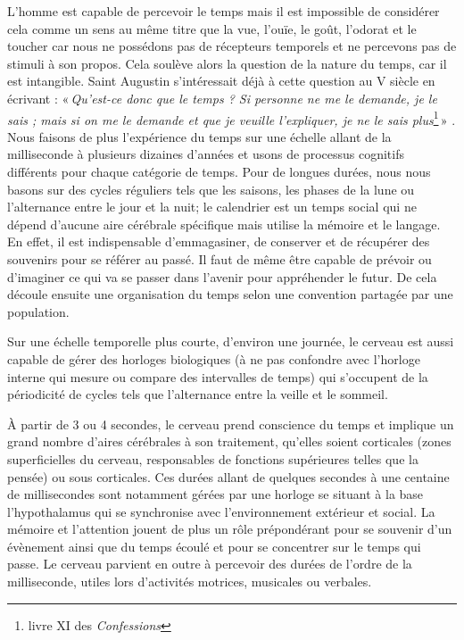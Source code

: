 \documentclass[12pt,fleqn,oneside,french,openany]{book} %
\begin{document}
L'homme est capable de percevoir le temps mais il est impossible de considérer cela comme un sens au même titre que la vue, l'ouïe, le goût, l'odorat et le toucher car nous ne possédons pas de récepteurs temporels et ne percevons pas de stimuli à son propos. Cela soulève alors la question de la nature du temps, car il est intangible. Saint Augustin s'intéressait déjà à cette question au V siècle en écrivant : «\,\emph{Qu’est-ce donc que le temps ? Si personne ne me le demande, je le sais ; mais si on me le demande et que je veuille l’expliquer, je ne le sais plus}\footnote{livre XI des \emph{Confessions}}\,» \cite{augustin}. Nous faisons de plus l'expérience du temps sur une échelle allant de la milliseconde à plusieurs dizaines d'années et usons de processus cognitifs différents pour chaque catégorie de temps. Pour de longues durées, nous nous basons sur des cycles réguliers tels que les saisons, les phases de la lune ou l'alternance entre le jour et la nuit; le calendrier est un temps social qui ne dépend d'aucune aire cérébrale spécifique mais utilise la mémoire et le langage. En effet, il est indispensable d'emmagasiner, de conserver et de récupérer des souvenirs pour se référer au passé. Il faut de même être capable de prévoir ou d'imaginer ce qui va se passer dans l'avenir pour appréhender le futur. De cela découle ensuite une organisation du temps selon une convention partagée par une population.

Sur une échelle temporelle plus courte, d'environ une journée, le cerveau est aussi capable de gérer des horloges biologiques (à ne pas confondre avec l'horloge interne qui mesure ou compare des intervalles de temps) qui s'occupent de la périodicité de cycles tels que l'alternance entre la veille et le sommeil. 

À partir de 3 ou 4 secondes, le cerveau prend conscience du temps et implique un grand nombre d'aires cérébrales à son traitement, qu'elles soient corticales (zones superficielles du cerveau, responsables de fonctions supérieures telles que la pensée) ou sous corticales. Ces durées allant de quelques secondes à une centaine de millisecondes sont notamment gérées par une horloge se situant à la base l'hypothalamus qui se synchronise avec l'environnement extérieur et social. La mémoire et l'attention jouent de plus un rôle prépondérant pour se souvenir d'un évènement ainsi que du temps écoulé et pour se concentrer sur le temps qui passe. Le cerveau parvient en outre à percevoir des durées de l'ordre de la milliseconde, utiles lors d'activités motrices, musicales ou verbales.
\end{document}
